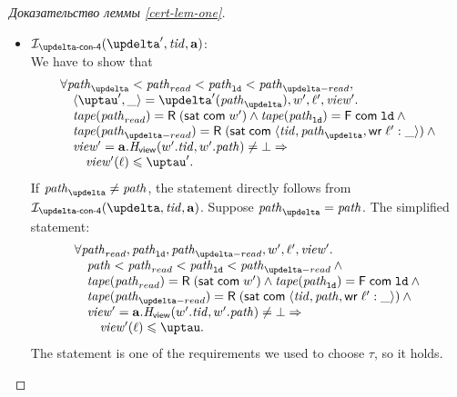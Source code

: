 \begin{proof}[Доказательство леммы \ref{cert-lem-one}]
\begin{itemize}
\begin{itemize}
        \item $\invDeltaDefFour(\delta', \tId, \aT)$: \\
          We have to show that
          \[\begin{array}{l}
      \forall \cpath_{\delta} < \cpath_{read} < \cpath_{\LD} < \cpath_{\delta-read}, \\
\quad \angled{\tau', \_} = \delta'(\cpath_{\delta}), \w', \loc', \R'. \\
\quad \tape(\cpath_{read}) = \tapeRead{(\tapeSatisfied{\Committed}{\w'})} \land \tape(\cpath_{\LD}) = \tapeFence{\Committed}{\LD} \land {} \\
\quad \tape(\cpath_{\delta-read}) = \tapeRead{(\tapeSatisfied{\Committed}{\stRequestWrite{\tId}{\cpath_{\delta}}{\loc'}{\_}})} \land {} \\
\quad \R' = \aT.\rmap(\w'.\tId, \w'.\cpath) \not = \bot \Rightarrow \\
\qquad \R'(\loc) \le \tau'. \\
          \end{array}\]
          If $\cpath_{\delta} \not = \cpath$, the statement directly follows from $\invDeltaDefFour(\delta, \tId, \aT)$.
          Suppose $\cpath_{\delta} = \cpath$. The simplified statement:
          \[\begin{array}{l}
      \forall \cpath_{read}, \cpath_{\LD}, \cpath_{\delta-read}, \w', \loc', \R'. \\
\quad \cpath < \cpath_{read} < \cpath_{\LD} < \cpath_{\delta-read} \land {} \\
\quad \tape(\cpath_{read}) = \tapeRead{(\tapeSatisfied{\Committed}{\w'})} \land \tape(\cpath_{\LD}) = \tapeFence{\Committed}{\LD} \land {} \\
\quad \tape(\cpath_{\delta-read}) = \tapeRead{(\tapeSatisfied{\Committed}{\stRequestWrite{\tId}{\cpath}{\loc'}{\_}})} \land {} \\
\quad \R' = \aT.\rmap(\w'.\tId, \w'.\cpath) \not = \bot \Rightarrow \\
\qquad \R'(\loc) \le \tau. \\
          \end{array}\]
          The statement is one of the requirements we used to choose $\tau$, so it holds.
      \end{itemize}
  \end{itemize}
\end{proof}


